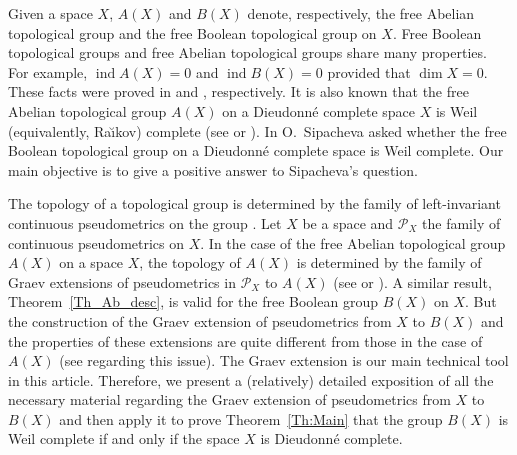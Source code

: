 \documentclass[a4paper,12pt]{amsart}
\newcommand{\ind}{\operatorname{ind}}
\let\mathcal\mathscr
\theoremstyle{definition}
\begin{document}
Given a space $X$, $A(X)$ and $B(X)$ denote, respectively, the free Abelian 
topological group and the free Boolean topological group on $X$. Free Boolean 
topological groups and free Abelian topological groups share many properties. 
For example, $\ind A(X)=0$ and $\ind B(X)=0$ provided that $\dim X=0$. These 
facts were proved in \cite[Theorem~2.1]{Si5} and \cite[Theorem~8]{Sip}, 
respectively. It is also known that the free Abelian topological group $A(X)$ 
on a Dieudonn\'e complete space $X$ is Weil (equivalently, Ra\u{\i}kov) 
complete (see \cite[Theorem~4]{Tk83} or \cite[Theorem~7.9.6]{AT}). In 
\cite[Problem~6]{Sip} O.~Sipacheva asked whether the free Boolean topological 
group on a Dieudonn\'e complete space is Weil complete. Our main objective is 
to give a positive answer to Sipacheva's question. 


The topology of a topological group is determined by the family 
of left-invariant continuous pseudometrics on the group 
\cite[Theorem~8.2]{HR}. Let $X$ be a space and $\mathcal{P}_X$
the family of continuous pseudometrics on $X$. In the case of 
the free Abelian topological group $A(X)$ on a space $X$, the 
topology of $A(X)$ is determined by the family of Graev 
extensions of pseudometrics in $\mathcal{P}_X$ to $A(X)$ (see
\cite{Marx} or \cite{Nick}). A similar result, Theorem~\ref{Th_Ab_desc},
is valid for the free Boolean group $B(X)$ on $X$. But the construction of the 
Graev extension of pseudometrics from $X$ to $B(X)$ and the properties of these 
extensions are quite different from those in the case of $A(X)$ (see 
\cite[p.~498]{Sip} regarding this issue). The Graev extension is our main 
technical tool in this article. Therefore, we present a (relatively) detailed 
exposition of all the necessary material regarding the Graev extension of 
pseudometrics from $X$ to $B(X)$ and then apply it to prove 
Theorem~\ref{Th:Main} that the group $B(X)$ is Weil complete if and only if the 
space $X$ is Dieudonn\'e complete.
\end{document}
